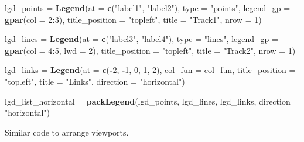 \documentclass[]{book}
\newenvironment{Shaded}{\begin{snugshade}}{\end{snugshade}}
\newcommand{\KeywordTok}[1]{\textcolor[rgb]{0.13,0.29,0.53}{\textbf{#1}}}
\newcommand{\DataTypeTok}[1]{\textcolor[rgb]{0.13,0.29,0.53}{#1}}
\newcommand{\DecValTok}[1]{\textcolor[rgb]{0.00,0.00,0.81}{#1}}
\newcommand{\StringTok}[1]{\textcolor[rgb]{0.31,0.60,0.02}{#1}}
\newcommand{\OperatorTok}[1]{\textcolor[rgb]{0.81,0.36,0.00}{\textbf{#1}}}
\newcommand{\NormalTok}[1]{#1}
\begin{document}
\begin{Shaded}
\begin{Highlighting}[]
\NormalTok{lgd_points =}\StringTok{ }\KeywordTok{Legend}\NormalTok{(}\DataTypeTok{at =} \KeywordTok{c}\NormalTok{(}\StringTok{"label1"}\NormalTok{, }\StringTok{"label2"}\NormalTok{), }\DataTypeTok{type =} \StringTok{"points"}\NormalTok{, }
    \DataTypeTok{legend_gp =} \KeywordTok{gpar}\NormalTok{(}\DataTypeTok{col =} \DecValTok{2}\OperatorTok{:}\DecValTok{3}\NormalTok{), }\DataTypeTok{title_position =} \StringTok{"topleft"}\NormalTok{, }
    \DataTypeTok{title =} \StringTok{"Track1"}\NormalTok{, }\DataTypeTok{nrow =} \DecValTok{1}\NormalTok{)}

\NormalTok{lgd_lines =}\StringTok{ }\KeywordTok{Legend}\NormalTok{(}\DataTypeTok{at =} \KeywordTok{c}\NormalTok{(}\StringTok{"label3"}\NormalTok{, }\StringTok{"label4"}\NormalTok{), }\DataTypeTok{type =} \StringTok{"lines"}\NormalTok{, }
    \DataTypeTok{legend_gp =} \KeywordTok{gpar}\NormalTok{(}\DataTypeTok{col =} \DecValTok{4}\OperatorTok{:}\DecValTok{5}\NormalTok{, }\DataTypeTok{lwd =} \DecValTok{2}\NormalTok{), }\DataTypeTok{title_position =} \StringTok{"topleft"}\NormalTok{, }
    \DataTypeTok{title =} \StringTok{"Track2"}\NormalTok{, }\DataTypeTok{nrow =} \DecValTok{1}\NormalTok{)}

\NormalTok{lgd_links =}\StringTok{ }\KeywordTok{Legend}\NormalTok{(}\DataTypeTok{at =} \KeywordTok{c}\NormalTok{(}\OperatorTok{-}\DecValTok{2}\NormalTok{, }\OperatorTok{-}\DecValTok{1}\NormalTok{, }\DecValTok{0}\NormalTok{, }\DecValTok{1}\NormalTok{, }\DecValTok{2}\NormalTok{), }\DataTypeTok{col_fun =}\NormalTok{ col_fun, }
    \DataTypeTok{title_position =} \StringTok{"topleft"}\NormalTok{, }\DataTypeTok{title =} \StringTok{"Links"}\NormalTok{, }\DataTypeTok{direction =} \StringTok{"horizontal"}\NormalTok{)}

\NormalTok{lgd_list_horizontal =}\StringTok{ }\KeywordTok{packLegend}\NormalTok{(lgd_points, lgd_lines, lgd_links, }
    \DataTypeTok{direction =} \StringTok{"horizontal"}\NormalTok{)}
\end{Highlighting}
\end{Shaded}

Similar code to arrange viewports.
\end{document}
